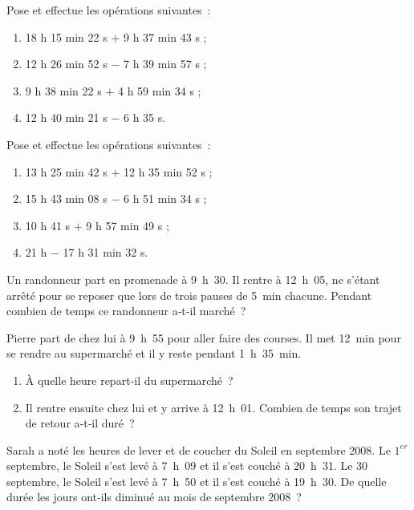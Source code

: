 \begin{exercice}
Pose et effectue les opérations suivantes :
\begin{enumerate} 
 \item 18 h 15 min 22 s $+$ 9 h 37 min 43 s ;
 \item 12 h 26 min 52 s $-$ 7 h 39 min 57 s ;
 \item 9 h 38 min 22 s $+$ 4 h 59 min 34 s ;
 \item 12 h 40 min 21 s $-$ 6 h 35 s.
 \end{enumerate}
\end{exercice}


\begin{exercice}
Pose et effectue les opérations suivantes :
\begin{enumerate} 
 \item 13 h 25 min 42 s $+$ 12 h 35 min 52 s ;
 \item 15 h 43 min 08 s $-$ 6 h 51 min 34 s ;
 \item 10 h 41 s $+$ 9 h 57 min 49 s ;
 \item 21 h $-$ 17 h 31 min 32 s.
 \end{enumerate}
\end{exercice}


\begin{exercice}
Un randonneur part en promenade à 9 h 30. Il rentre à 12 h 05, ne s'étant arrêté pour se reposer que lors de trois pauses de 5 min chacune. Pendant combien de temps ce randonneur a‑t‑il marché ?
\end{exercice}


\begin{exercice}
Pierre part de chez lui à 9 h 55 pour aller faire des courses. Il met 12 min pour se rendre au supermarché et il y reste pendant 1 h 35 min.
\begin{enumerate} 
 \item À quelle heure repart‑il du supermarché ?
 \item Il rentre ensuite chez lui et y arrive à 12 h 01. Combien de temps son trajet de retour a‑t‑il duré ?
 \end{enumerate}
\end{exercice}


\begin{exercice}
Sarah a noté les heures de lever et de coucher du Soleil en septembre 2008. Le $1^{er}$ septembre, le Soleil s'est levé à 7 h 09 et il s'est couché à 20 h 31. Le 30 septembre, le Soleil s'est levé à 7 h 50 et il s'est couché à 19 h 30. De quelle durée les jours ont‑ils diminué au mois de septembre 2008 ?
\end{exercice}
 
